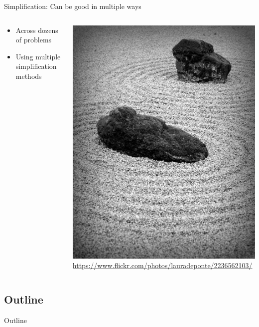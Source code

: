 \documentclass{beamer}
\begin{document}
\begin{frame}{Simplification: Can be good in multiple ways}
\begin{columns}
\begin{column}{0.6\textwidth}
\begin{itemize}
	\item Across dozens of problems
	\item Using multiple simplification methods
\end{itemize}
\end{column}
\begin{column}{0.4\textwidth}
\center \includegraphics[height=0.7\textheight]{Illustrations/zen.jpg} \\
\tiny \url{https://www.flickr.com/photos/lauradeponte/2236562103/}
\end{column}
\end{columns}
\end{frame}

\subsection*{Outline}

\begin{frame}{Outline}
  \tableofcontents[hideallsubsections]
\end{frame}
\end{document}
